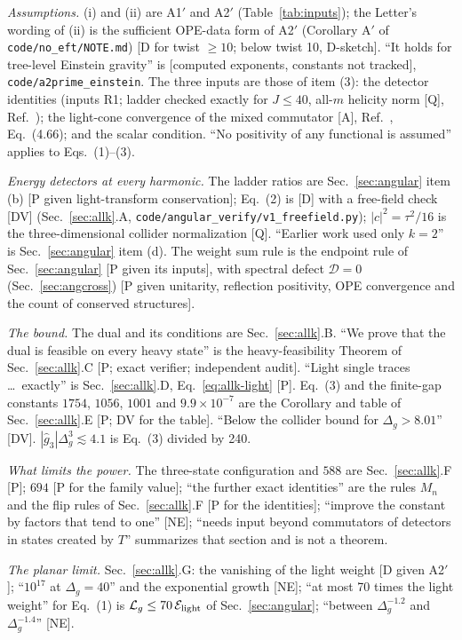 \documentclass[aps,prl,onecolumn,superscriptaddress,nofootinbib]{revtex4-2}
\begin{document}
\emph{Assumptions.} (i) and (ii) are A1$'$ and A2$'$ (Table~\ref{tab:inputs}); the Letter's wording of (ii) is the sufficient OPE-data
form of A2$'$ (Corollary A$'$ of \texttt{code/no\_eft/NOTE.md}) [D for twist $\ge10$; below twist 10, D-sketch]. ``It holds for tree-level
Einstein gravity'' is [computed exponents, constants not tracked], \texttt{code/a2prime\_einstein}. The three inputs are those of item (3):
the detector identities (inputs R1; ladder checked exactly for $J\le40$, all-$m$ helicity norm [Q], Ref.~\cite{GilliozSpinors}); the
light-cone convergence of the mixed commutator [A], Ref.~\cite{KKSDZ}, Eq.~(4.66); and the scalar condition. ``No positivity of any
functional is assumed'' applies to Eqs.~(1)--(3).

\emph{Energy detectors at every harmonic.} The ladder ratios are Sec.~\ref{sec:angular} item (b) [P given light-transform conservation];
Eq.~(2) is [D] with a free-field check [DV] (Sec.~\ref{sec:allk}.A, \texttt{code/angular\_verify/v1\_freefield.py}); $|c|^2=\tau^2/16$ is the
three-dimensional collider normalization [Q]. ``Earlier work used only $k=2$'' is Sec.~\ref{sec:angular} item (d). The weight sum rule is
the endpoint rule of Sec.~\ref{sec:angular} [P given its inputs], with spectral defect $\mathcal D=0$ (Sec.~\ref{sec:angcross}) [P given
unitarity, reflection positivity, OPE convergence and the count of conserved structures].

\emph{The bound.} The dual and its conditions are Sec.~\ref{sec:allk}.B. ``We prove that the dual is feasible on every heavy state'' is the
heavy-feasibility Theorem of Sec.~\ref{sec:allk}.C [P; exact verifier; independent audit]. ``Light single traces \dots\ exactly'' is
Sec.~\ref{sec:allk}.D, Eq.~\eqref{eq:allk-light} [P]. Eq.~(3) and the finite-gap constants $1754$, $1056$, $1001$ and $9.9\times10^{-7}$ are the
Corollary and table of Sec.~\ref{sec:allk}.E [P; DV for the table]. ``Below the collider bound for $\Delta_g>8.01$'' [DV].
$|\hat g_3|\Delta_g^3\lesssim4.1$ is Eq.~(3) divided by 240.

\emph{What limits the power.} The three-state configuration and $588$ are Sec.~\ref{sec:allk}.F [P]; $694$ [P for the family value];
``the further exact identities'' are the rules $M_n$ and the flip rules of Sec.~\ref{sec:allk}.F [P for the identities]; ``improve the
constant by factors that tend to one'' [NE]; ``needs input beyond commutators of detectors in states created by $T$'' summarizes that
section and is not a theorem.

\emph{The planar limit.} Sec.~\ref{sec:allk}.G: the vanishing of the light weight [D given A2$'$]; ``$10^{17}$ at $\Delta_g=40$'' and the
exponential growth [NE]; ``at most 70 times the light weight'' for Eq.~(1) is $\mathcal L_g\le70\,\mathcal E_{\rm light}$ of
Sec.~\ref{sec:angular}; ``between $\Delta_g^{-1.2}$ and $\Delta_g^{-1.4}$'' [NE].
\end{document}
